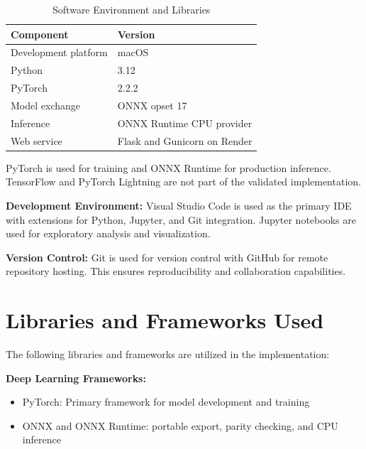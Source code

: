\documentclass[12pt,a4paper]{report}
\begin{document}
\begin{table}[H]
\centering
\caption{Software Environment and Libraries}
\label{tab:software}
\begin{tabular}{|l|l|}
\hline
\textbf{Component} & \textbf{Version} \\
\hline
Development platform & macOS \\
Python & 3.12 \\
PyTorch & 2.2.2 \\
Model exchange & ONNX opset 17 \\
Inference & ONNX Runtime CPU provider \\
Web service & Flask and Gunicorn on Render \\
\hline
\end{tabular}
\end{table}

PyTorch is used for training and ONNX Runtime for production inference. TensorFlow and PyTorch Lightning are not part of the validated implementation.

\vspace{0.5cm}

\textbf{Development Environment:} Visual Studio Code is used as the primary IDE with extensions for Python, Jupyter, and Git integration. Jupyter notebooks are used for exploratory analysis and visualization.

\vspace{0.5cm}

\textbf{Version Control:} Git is used for version control with GitHub for remote repository hosting. This ensures reproducibility and collaboration capabilities.

\section{Libraries and Frameworks Used}

The following libraries and frameworks are utilized in the implementation:

\vspace{0.5cm}

\textbf{Deep Learning Frameworks:}
\begin{itemize}
    \item PyTorch: Primary framework for model development and training
    \item ONNX and ONNX Runtime: portable export, parity checking, and CPU inference
\end{itemize}

\vspace{0.5cm}
\end{document}
